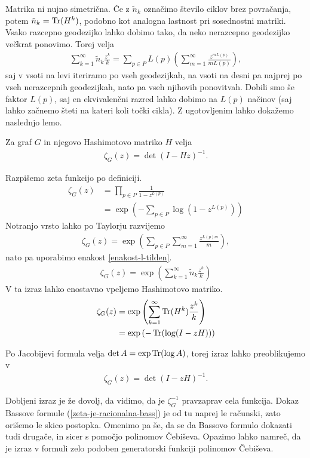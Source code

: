 Matrika ni nujno simetrična. Če z \(\tilde{n}_k\) označimo število ciklov brez povračanja, potem \(\tilde{n}_k = \operatorname{Tr}(H^k)\), podobno kot analogna lastnost pri sosednostni matriki. Vsako razcepno geodezijko lahko dobimo tako, da neko nerazcepno geodezijko večkrat ponovimo. Torej velja
\begin{align}\label{enakost-l-tilden}
    \sum_{k=1}^\infty \tilde{n}_k \frac{z^k}{k} = \sum_{p\in P} L(p)\left(\sum_{m=1}^\infty \frac{z^{mL(p)}}{mL(p)}\right),
\end{align}
saj v vsoti na levi iteriramo po vseh geodezijkah, na vsoti na desni pa najprej po vseh nerazcepnih geodezijkah, nato pa vseh njihovih ponovitvah. Dobili smo še faktor \(L(p)\), saj en ekvivalenčni razred lahko dobimo na \(L(p)\) načinov (saj lahko začnemo šteti na kateri koli točki cikla). Z ugotovljenim lahko dokažemo naslednjo lemo.

\begin{lema}
    Za graf \(G\) in njegovo Hashimotovo matriko \(H\) velja
    \begin{align*}
        \zeta_G(z) = \det(I-Hz)^{-1}.
    \end{align*}
\end{lema}
\begin{dokaz}
    Razpišemo zeta funkcijo po definiciji.
    \begin{align*}
        \zeta_G(z) &= \prod_{p\in P}\frac{1}{1-z^{L(p)}} \\
        &= \exp\left(-\sum_{p\in P}\log(1-z^{L(p)})\right)
    \end{align*}
    Notranjo vrsto lahko po Taylorju razvijemo
    \begin{align*}
        \zeta_G(z) =\exp\left(\sum_{p\in P}\sum_{m=1}^\infty \frac{z^{L(p)m}}{m}\right),
    \end{align*}
    nato pa uporabimo enakost \ref{enakost-l-tilden}.
    \begin{align*}
        \zeta_G(z) =\exp\left(\sum_{k=1}^\infty \tilde{n}_k \frac{z^k}{k}\right)
    \end{align*}
    V ta izraz lahko enostavno vpeljemo Hashimotovo matriko.
    \begin{align*}
        \zeta_G(z) &= \exp\left(\sum_{k=1}^\infty \operatorname{Tr}(H^k)\frac{z^k}{k}\right)\\
        &= \exp\left(-\operatorname{Tr}(\log(I - zH))\right)
    \end{align*}

    Po Jacobijevi formula velja \(\det A = \exp \operatorname{Tr}(\log A)\), torej izraz lahko preoblikujemo v
    \begin{align*}
        \zeta_G(z) = \det(I-zH)^{-1}.
    \end{align*}
\end{dokaz}
Dobljeni izraz je že dovolj, da vidimo, da je \(\zeta_G^{-1}\) pravzaprav cela funkcija. Dokaz Bassove formule (\ref{zeta-je-racionalna-bass}) je od tu naprej le računski, zato orišemo le skico postopka. Omenimo pa še, da se da Bassovo formulo dokazati tudi drugače, in sicer s pomočjo polinomov Čebiševa. Opazimo lahko namreč, da je izraz v formuli zelo podoben generatorski funkciji polinomov Čebiševa.

